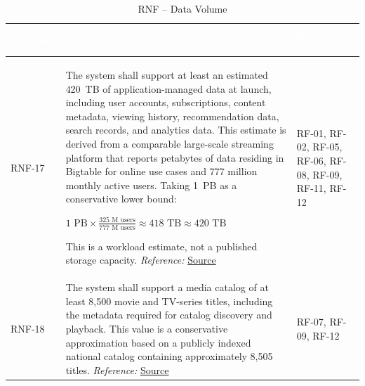 \documentclass{article}
\begin{document}
\begin{table}[H]

\centering

\small

\renewcommand{\arraystretch}{1.35}

\caption{RNF -- Data Volume}

\label{tab:rnf_data_volume}

\begin{tabularx}{\textwidth}{|p{2.2cm}|X|p{3.5cm}|}

\hline

\rowcolor[HTML]{1F2937}

\textcolor{white}{\textbf{Identifier}} &
\textcolor{white}{\textbf{Description}} &
\textcolor{white}{\textbf{RF associated}} \\ \hline

RNF-17 &
The system shall support at least an estimated 420~TB of application-managed data at launch, including user accounts, subscriptions, content metadata, viewing history, recommendation data, search records, and analytics data. This estimate is derived from a comparable large-scale streaming platform that reports petabytes of data residing in Bigtable for online use cases and 777 million monthly active users. Taking 1~PB as a conservative lower bound:

\(\displaystyle
1\text{ PB}\times
\frac{325\text{ M users}}
{777\text{ M users}}
\approx418\text{ TB}
\approx420\text{ TB}
\)

This is a workload estimate, not a published storage capacity.
\textit{Reference:} \href{https://engineering.atspotify.com/2026/7/indexing-the-data-lake-for-online-point-queries}{Source}
&
RF-01, RF-02, RF-05, RF-06, RF-08, RF-09, RF-11, RF-12 \\ \hline

RNF-18 &
The system shall support a media catalog of at least 8{,}500 movie and TV-series titles, including the metadata required for catalog discovery and playback. This value is a conservative approximation based on a publicly indexed national catalog containing approximately 8{,}505 titles.
\textit{Reference:} \href{https://www.justwatch.com/uk/provider/netflix}{Source}
&
RF-07, RF-09, RF-12 \\ \hline

\end{tabularx}

\end{table}


\end{document}
